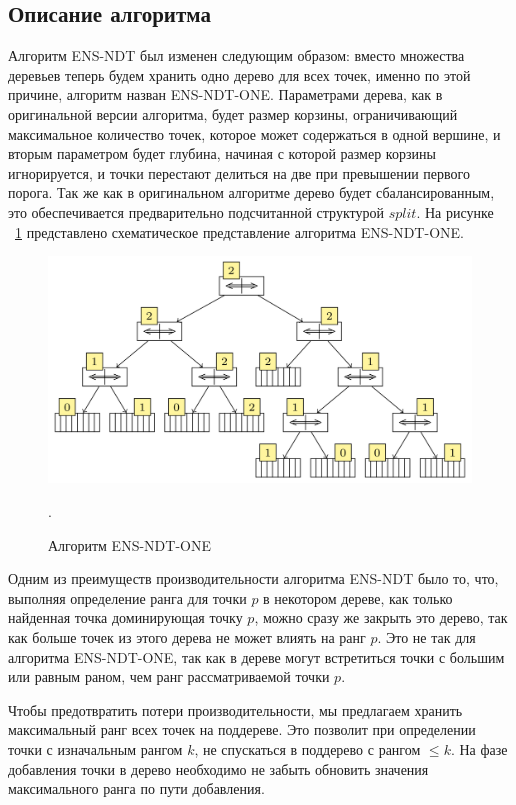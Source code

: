 \subsection{Описание алгоритма}

Алгоритм ENS-NDT был изменен следующим образом: вместо множества деревьев теперь будем хранить одно дерево для всех точек, именно по этой причине, алгоритм назван ENS-NDT-ONE. Параметрами дерева, как в оригинальной версии алгоритма, будет размер корзины, ограничивающий максимальное количество точек, которое может содержаться в одной вершине, и вторым параметром будет глубина, начиная с которой размер корзины игнорируется, и точки перестают делиться на две при превышении первого порога. Так же как в оригинальном алгоритме дерево будет сбалансированным, это обеспечивается предварительно подсчитанной структурой $split$. На рисунке ~\ref{ndtree_new} представлено схематическое представление алгоритма ENS-NDT-ONE.

\begin{figure}[!h]
\begin{center}
\includegraphics[width=15cm]{pic/ndtree_new.png}
\caption{Алгоритм ENS-NDT-ONE}.
\label{ndtree_new}
\end{center}
\end{figure}

Одним из преимуществ производительности алгоритма ENS-NDT было то, что, выполняя определение ранга для точки $p$ в некотором дереве, как только найденная точка доминирующая точку $p$, можно сразу же закрыть это дерево, так как больше точек из этого дерева не может влиять на ранг $p$. Это не так для алгоритма ENS-NDT-ONE, так как в дереве могут встретиться точки с большим или равным раном, чем ранг рассматриваемой точки $p$.

Чтобы предотвратить потери производительности, мы предлагаем хранить максимальный ранг всех точек на поддереве. Это позволит при определении точки с изначальным рангом $k$, не спускаться в поддерево с рангом $\leq k$. На фазе добавления точки в дерево необходимо не забыть обновить значения максимального ранга по пути добавления.


